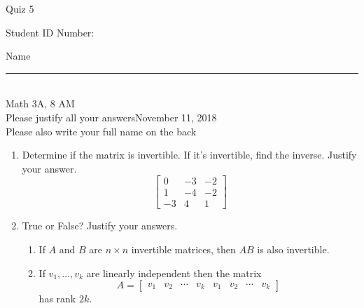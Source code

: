 \documentclass[12pt]{article}
\begin{document}
\begin{flushleft} 
\centerline{\LARGE{Quiz 5}} 
\vspace{5 mm}
{Student ID Number:}\hfill  
{Name \rule {2 in}{0.01in}}\\
Math 3A, 8 AM
\\
{Please justify all your answers}\hfill {November 11, 2018}
\\
{Please also write your full name on the back} 

\medskip
\end{flushleft}

\begin{enumerate}
	\item Determine if the matrix is invertible. If it's invertible, find the inverse. Justify your answer.
	\[
		\begin{bmatrix}
			0 & -3 & -2\\
			1 & -4 & -2\\
			-3 & 4 & 1
		\end{bmatrix}
	\]
	\vfill

	\item True or False? Justify your answers.
	\begin{enumerate}
		\item If $A$ and $B$ are $n\times n$ invertible matrices, then $AB$ is also invertible.
		\vfill
		\item If $v_1, \ldots, v_k$ are linearly independent then the matrix
		\[
		A = \begin{bmatrix}
			v_1 & v_2 & \cdots & v_k& v_1 & v_2 & \cdots & v_k
		\end{bmatrix}
		\]
		has rank $2k$.
	\end{enumerate}
	\vfill
\end{enumerate}


\end{document}
